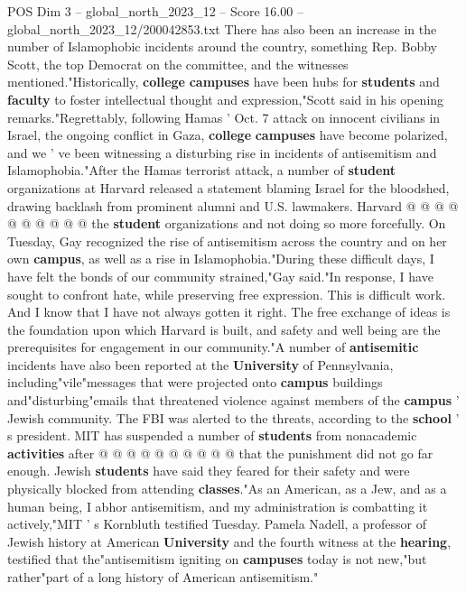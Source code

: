 \begin{textsample}{POS Dim 3 – global\_north\_2023\_12 – Score 16.00 – global\_north\_2023\_12/200042853.txt}
There has also been an increase in the number of Islamophobic incidents around the country, something Rep.
Bobby Scott, the top Democrat on the committee, and the witnesses mentioned."Historically, \textbf{college} \textbf{campuses} have been hubs for \textbf{students} and \textbf{faculty} to foster intellectual thought and expression,"Scott said in his opening remarks."Regrettably, following Hamas ' Oct. 7 attack on innocent civilians in Israel, the ongoing conflict in Gaza, \textbf{college} \textbf{campuses} have become polarized, and we ' ve been witnessing a disturbing rise in incidents of antisemitism and Islamophobia."After the Hamas terrorist attack, a number of \textbf{student} organizations at Harvard released a statement blaming Israel for the bloodshed, drawing backlash from prominent alumni and U.S. lawmakers.
Harvard @ @ @ @ @ @ @ @ @ @ the \textbf{student} organizations and not doing so more forcefully.
On Tuesday, Gay recognized the rise of antisemitism across the country and on her own \textbf{campus}, as well as a rise in Islamophobia."During these difficult days, I have felt the bonds of our community strained,"Gay said."In response, I have sought to confront hate, while preserving free expression.
This is difficult work.
And I know that I have not always gotten it right.
The free exchange of ideas is the foundation upon which Harvard is built, and safety and well being are the prerequisites for engagement in our community."A number of \textbf{antisemitic} incidents have also been reported at the \textbf{University} of Pennsylvania, including"vile"messages that were projected onto \textbf{campus} buildings and"disturbing"emails that threatened violence against members of the \textbf{campus} ' Jewish community.
The FBI was alerted to the threats, according to the \textbf{school} ' s president.
MIT has suspended a number of \textbf{students} from nonacademic \textbf{activities} after @ @ @ @ @ @ @ @ @ @ that the punishment did not go far enough.
Jewish \textbf{students} have said they feared for their safety and were physically blocked from attending \textbf{classes}."As an American, as a Jew, and as a human being, I abhor antisemitism, and my administration is combatting it actively,"MIT ' s Kornbluth testified Tuesday.
Pamela Nadell, a professor of Jewish history at American \textbf{University} and the fourth witness at the \textbf{hearing}, testified that the"antisemitism igniting on \textbf{campuses} today is not new,"but rather"part of a long history of American antisemitism."

\end{textsample}
